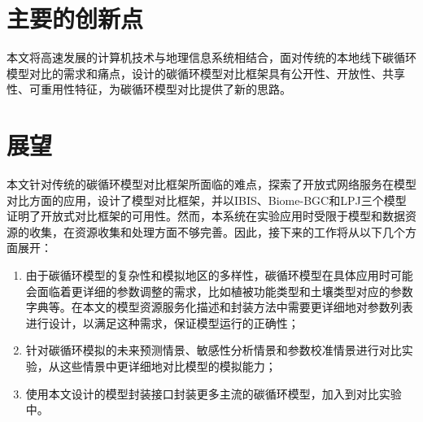\section{主要的创新点}
本文将高速发展的计算机技术与地理信息系统相结合，面对传统的本地线下碳循环模型对比的需求和痛点，设计的碳循环模型对比框架具有公开性、开放性、共享性、可重用性特征，为碳循环模型对比提供了新的思路。

\section{展望}
本文针对传统的碳循环模型对比框架所面临的难点，探索了开放式网络服务在模型对比方面的应用，设计了模型对比框架，并以IBIS、Biome-BGC和LPJ三个模型证明了开放式对比框架的可用性。然而，本系统在实验应用时受限于模型和数据资源的收集，在资源收集和处理方面不够完善。因此，接下来的工作将从以下几个方面展开：

\begin{enumerate}[(1)]
    \item 由于碳循环模型的复杂性和模拟地区的多样性，碳循环模型在具体应用时可能会面临着更详细的参数调整的需求，比如植被功能类型和土壤类型对应的参数字典等。在本文的模型资源服务化描述和封装方法中需要更详细地对参数列表进行设计，以满足这种需求，保证模型运行的正确性；
    \item 针对碳循环模拟的未来预测情景、敏感性分析情景和参数校准情景进行对比实验，从这些情景中更详细地对比模型的模拟能力；
    \item 使用本文设计的模型封装接口封装更多主流的碳循环模型，加入到对比实验中。
\end{enumerate}